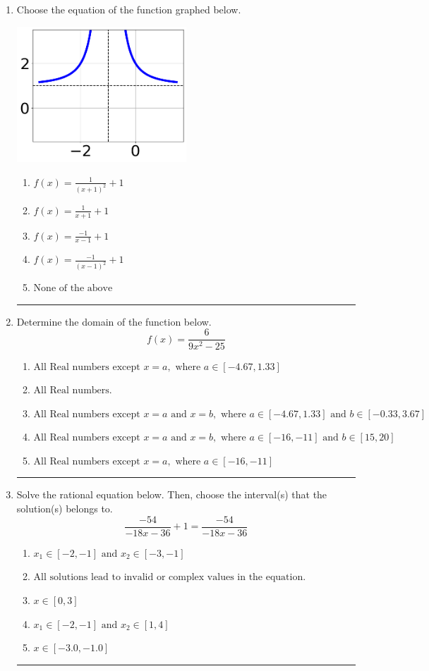 \documentclass[14pt]{extbook}
\newcommand{\litem}[1]{\item#1\hspace*{-1cm}\rule{\textwidth}{0.4pt}}
\begin{document}
\begin{enumerate}
{\begin{enumerate}[label=\Alph*.]
\end{enumerate} }
\litem{
Choose the equation of the function graphed below.
\begin{center}
    \includegraphics[width=0.5\textwidth]{../Figures/rationalGraphToEquationCopyB.png}
\end{center}
\begin{enumerate}[label=\Alph*.]
\item \( f(x) = \frac{1}{(x + 1)^2} + 1 \)
\item \( f(x) = \frac{1}{x + 1} + 1 \)
\item \( f(x) = \frac{-1}{x - 1} + 1 \)
\item \( f(x) = \frac{-1}{(x - 1)^2} + 1 \)
\item \( \text{None of the above} \)

\end{enumerate} }
\litem{
Determine the domain of the function below.\[ f(x) = \frac{6}{9x^{2} -25} \]\begin{enumerate}[label=\Alph*.]
\item \( \text{All Real numbers except } x = a, \text{ where } a \in [-4.67, 1.33] \)
\item \( \text{All Real numbers.} \)
\item \( \text{All Real numbers except } x = a \text{ and } x = b, \text{ where } a \in [-4.67, 1.33] \text{ and } b \in [-0.33, 3.67] \)
\item \( \text{All Real numbers except } x = a \text{ and } x = b, \text{ where } a \in [-16, -11] \text{ and } b \in [15, 20] \)
\item \( \text{All Real numbers except } x = a, \text{ where } a \in [-16, -11] \)

\end{enumerate} }
\litem{
Solve the rational equation below. Then, choose the interval(s) that the solution(s) belongs to.\[ \frac{-54}{-18x -36} + 1 = \frac{-54}{-18x -36} \]\begin{enumerate}[label=\Alph*.]
\item \( x_1 \in [-2, -1] \text{ and } x_2 \in [-3,-1] \)
\item \( \text{All solutions lead to invalid or complex values in the equation.} \)
\item \( x \in [0,3] \)
\item \( x_1 \in [-2, -1] \text{ and } x_2 \in [1,4] \)
\item \( x \in [-3.0,-1.0] \)


\end{enumerate}}
\end{enumerate}
\end{document}
